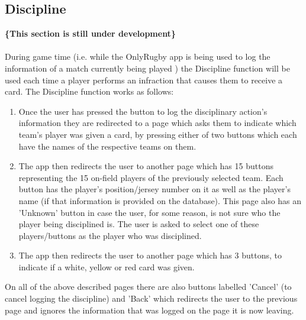\documentclass[hidelinks,a4paper,12pt]{article}
\begin{document}
	\subsection{Discipline}
	{\bfseries\{This section is still under development\}}\\ \\
		During game time (i.e. while the OnlyRugby app is being used to log the information of a match currently being played ) the Discipline function will be used each time a player performs an infraction that causes them to receive a card. The Discipline function works as follows:
		\begin{enumerate}
			\item Once the user has pressed the button to log the disciplinary action's information they are redirected to a page which asks them to indicate which team's player was given a card, by pressing either of two buttons which each have the names of the respective teams on them.
			\item The app then redirects the user to another page which has 15 buttons representing the 15 on-field players of the previously selected team. Each button has the player's position/jersey number on it as well as the player's name (if that information is provided on the database). This page also has an 'Unknown' button in case the user, for some reason, is not sure who the player being disciplined is. The user is asked to select one of these players/buttons as the player who was disciplined.
			\item The app then redirects the user to another page which has 3 buttons, to indicate if a white, yellow or red card was given.
		\end{enumerate}
	On all of the above described pages there are also buttons labelled 'Cancel' (to cancel logging the discipline) and 'Back' which redirects the user to the previous page and ignores the information that was logged on the page it is now leaving.
\end{document}
